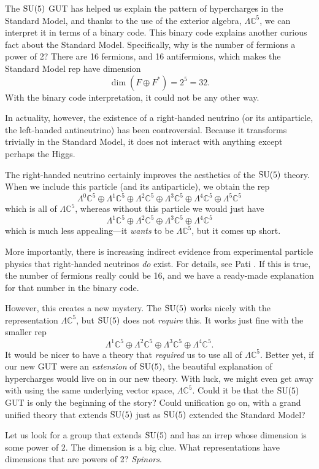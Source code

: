 \documentclass[12pt]{article}
\newcommand{\C}{{\mathbb C}}  %
\newcommand{\SU}{{\rm SU}}    %
\newcommand{\Ex}{\Lambda} %
\begin{document}
The $\SU(5)$ GUT has helped us explain the pattern of hypercharges in the
Standard Model, and thanks to the use of the exterior algebra, $\Ex \C^5$, we
can interpret it in terms of a binary code. This binary code explains another
curious fact about the Standard Model. Specifically, why is the number of
fermions a power of 2? There are 16 fermions, and 16 antifermions, which 
makes the
Standard Model rep have dimension
\[ \dim (F \oplus F^*) = 2^5 = 32. \]
With the binary code interpretation, it could not be any other way.

In actuality, however, the existence of a right-handed neutrino (or its
antiparticle, the left-handed antineutrino) has been controversial. Because it
transforms trivially in the Standard Model, it does not interact
with anything except perhaps the Higgs.

The right-handed neutrino certainly improves the aesthetics of the
$\SU(5)$ theory.  When we include this particle (and its antiparticle),
we obtain the rep
\[ \Ex^0 \C^5 \oplus \Ex^1 \C^5 \oplus \Ex^2 \C^5 \oplus \Ex^3 \C^5 \oplus \Ex^4 \C^5 \oplus \Ex^5 \C^5    \]
which is all of $\Ex \C^5$, whereas without this particle
we would just have
\[ \Ex^1 \C^5 \oplus \Ex^2 \C^5 \oplus \Ex^3 \C^5 \oplus \Ex^4 \C^5  \]
which is much less appealing---it \emph{wants} to be $\Ex \C^5$, but
it comes up short.   

More importantly, there is increasing indirect evidence from
experimental particle physics that right-handed neutrinos \emph{do}
exist.   For details, see Pati \cite{pati:probing}.  
If this is true, the number of fermions really could be 16, and we have a
ready-made explanation for that number in the binary code.

However, this creates a new mystery.  The
$\SU(5)$ works nicely with the representation $\Ex \C^5$, but $\SU(5)$ does 
not \emph{require} this.  It works just fine with the smaller rep
\[ \Ex^1 \C^5 \oplus \Ex^2 \C^5 \oplus \Ex^3 \C^5 \oplus \Ex^4 \C^5 .\]
It would be nicer to have a theory that \emph{required} us
to use all of $\Lambda \C^5$.  Better yet, if our new GUT were an
\emph{extension} of $\SU(5)$, the beautiful explanation of hypercharges
would live on in our new theory.  With luck, we might even get away with 
using the same underlying vector space, $\Ex \C^5$.
Could it be that the $\SU(5)$ GUT is only the beginning of the story? Could
unification go on, with a grand unified theory that extends $\SU(5)$ just as
$\SU(5)$ extended the Standard Model?

Let us look for a group that extends $\SU(5)$ and has an irrep whose
dimension is some power of 2.  The dimension is a big clue.  What
representations have dimensions that are powers of 2? \emph{Spinors}.
\end{document}
